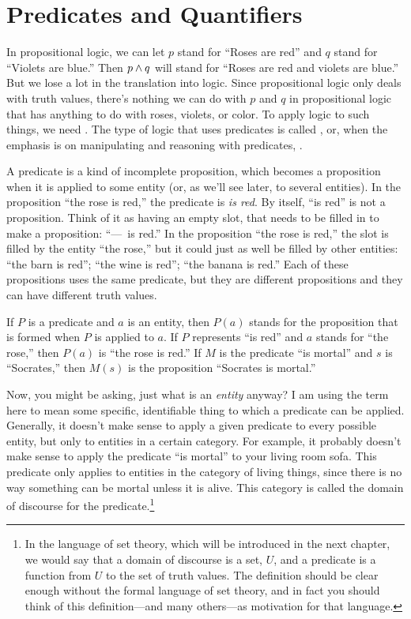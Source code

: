 \section{Predicates and Quantifiers}\label{S-logic-4}

In propositional logic, we can let $p$ stand for ``Roses are red'' and
$q$ stand for ``Violets are blue.''  Then $p\wedge q$ will stand for
``Roses are red and violets are blue.''  But we lose a lot in the
translation into logic.  Since propositional logic only deals with
truth values, there's nothing we can do with $p$ and $q$ in propositional
logic that has anything to do with roses, violets, or color.
To apply logic to such things, we need .
The type of logic that uses predicates is called , or, when the emphasis is on manipulating and reasoning
with predicates, .

A predicate is a kind of incomplete proposition, which becomes
a proposition when it is applied to some entity (or, as we'll see later,
to several entities).  In the proposition ``the rose is red,'' the
predicate is \emph{is red}.  By itself, ``is red'' is not a proposition.
Think of it as having an empty slot, that needs to be filled in
to make a proposition: ``---~is red.''  In the proposition
``the rose is red,'' the slot is filled by the entity ``the rose,''
but it could just as well be filled by other entities:
``the barn is red''; ``the wine is red''; ``the banana is red.''
Each of these propositions uses the same predicate, but they are
different propositions and they can have different truth values.

If $P$ is a predicate and $a$ is an entity, then $P(a)$ stands for
the proposition that is formed when $P$ is applied to $a$.  If $P$
represents ``is red'' and $a$ stands for ``the rose,'' then
$P(a)$ is ``the rose is red.''  If $M$ is the predicate
``is mortal'' and $s$ is ``Socrates,'' then $M(s)$ is the proposition
``Socrates is mortal.'' 

Now, you might be asking, just what is an \emph{entity} anyway?
I am using the term here to mean some specific, identifiable thing
to which a predicate can be applied.  Generally, it doesn't make
sense to apply a given predicate to every possible entity, but only
to entities in a certain category.  For example, it probably doesn't
make sense to apply the predicate ``is mortal'' to your living room
sofa.  This predicate only applies to entities in the category of
living things, since there is no way something can be mortal unless it
is alive.  This category is called the domain of discourse for
the predicate.\footnote{In the language
of set theory, which will be introduced in the next chapter,
we would say that a domain of discourse is a set, $U$, and
a predicate is a function from $U$ to the set of truth values.
The definition should be clear enough without the formal language
of set theory, and in fact you should think of this definition---and
many others---as motivation for that language.}

